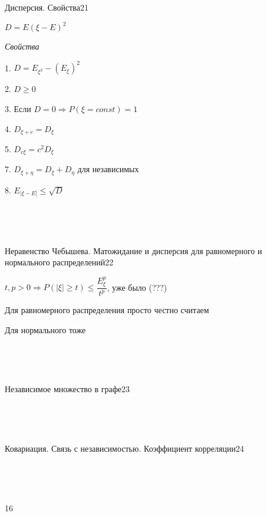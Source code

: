 \documentclass{article}
\begin{document}
~\

~\

\begin{question}{Дисперсия. Свойства}{21}

$D = E(\xi - E)^2$

\textit{Свойства}

1. $D = E_{\xi^2} - (E_{\xi})^2$

2. $D \geq 0$

3. Если $D = 0 \Rightarrow P(\xi = const) = 1$

4. $D_{\xi + c} = D_\xi$

5. $D_{c \xi} = c^2 D_{\xi}$

7. $D_{\xi + \eta} = D_\xi + D_\eta$ для независимых

8. $E_{|\xi - E|} \leq \sqrt{D}$

\end{question}

~\

~\

\begin{question}{Неравенство Чебышева. Матожидание и дисперсия для равномерного и нормального распределений}{22}

$t, p > 0 \Rightarrow P(|\xi| \geq t) \leq \dfrac{E_{\xi}^p}{t^p}$, уже было (???)

Для равномерного распределения просто честно считаем

Для нормального тоже

\end{question}

~\

~\

\begin{question}{Независимое множество в графе}{23}

\end{question}

~\

~\

\begin{question}{Ковариация. Связь с независимостью. Коэффициент корреляции}{24}



\end{question}

~\

~\

\begin{question}{}{16}

\end{question}

~\
\end{document}
